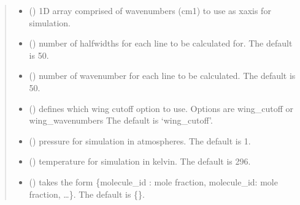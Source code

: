 \documentclass[letterpaper,10pt,english]{sphinxmanual}
\begin{document}
\begin{fulllineitems}
\begin{quote}
\begin{description}
\begin{itemize}
\begin{description}
\end{description}


\item {} 
\sphinxAtStartPar
{} () \textendash{} 1\sphinxhyphen{}D array comprised of wavenumbers (cm\sphinxhyphen{}1) to use as x\sphinxhyphen{}axis for simulation.

\item {} 
\sphinxAtStartPar
{} (\sphinxstyleliteralemphasis{\sphinxupquote{, }}) \textendash{} number of half\sphinxhyphen{}widths for each line to be calculated for. The default is 50.

\item {} 
\sphinxAtStartPar
{} (\sphinxstyleliteralemphasis{\sphinxupquote{, }}) \textendash{} number of wavenumber for each line to be calculated. The default is 50.

\item {} 
\sphinxAtStartPar
{} (\sphinxstyleliteralemphasis{\sphinxupquote{, }}) \textendash{} defines which wing cut\sphinxhyphen{}off option to use.  Options are wing\_cutoff or wing\_wavenumbers The default is ‘wing\_cutoff’.

\item {} 
\sphinxAtStartPar
{} (\sphinxstyleliteralemphasis{\sphinxupquote{, }}) \textendash{} pressure for simulation in atmospheres. The default is 1.

\item {} 
\sphinxAtStartPar
{} (\sphinxstyleliteralemphasis{\sphinxupquote{, }}) \textendash{} temperature for simulation in kelvin. The default is 296.

\item {} 
\sphinxAtStartPar
{} (\sphinxstyleliteralemphasis{\sphinxupquote{, }}) \textendash{} takes the form \{molecule\_id : mole fraction, molecule\_id: mole fraction, …\}. The default is \{\}.


\end{itemize}
\end{description}
\end{quote}
\end{fulllineitems}
\end{document}
